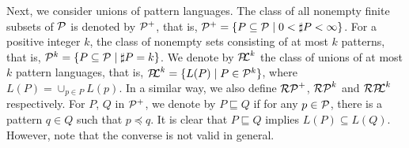 Next, we consider unions of pattern languages. %
The class of all nonempty finite subsets of $\mathcal{P}$ is denoted by $\mathcal{P}^{+}$, that is,
$\mathcal{P}^{+} = \{P \subseteq \mathcal{P} \mid 0 < \sharp P < \infty\}$.
For a positive integer $k$, the class of nonempty sets consisting of at most $k$ patterns, that is,
$\mathcal{P}^{k} = \{P \subseteq \mathcal{P} \mid \sharp P = k\}$.
We denote by $\mathcal{P\!\!L}^{k}$ the class of unions of at most $k$ pattern languages,
that is, $\mathcal{P\!\!L}^{k} = \{L(P) \mid P \in \mathcal{P}^{k}\}$,
where $L(P) = \cup_{p \in P}L(p)$.
In a similar way, we also define $\mathcal{RP}^{+}$, $\mathcal{RP}^{k}$ and $\mathcal{RP\!\!L}^{k}$ respectively.
%
For $P$, $Q$ in $\mathcal{P}^{+}$,
we denote by $P \sqsubseteq Q$ if for any $p \in \mathcal{P}$, there is a pattern $q \in Q$ such that $p \preceq q$.
It is clear that $P \sqsubseteq Q$ implies $L(P) \subseteq L(Q)$.
However, note that the converse is not valid in general.

